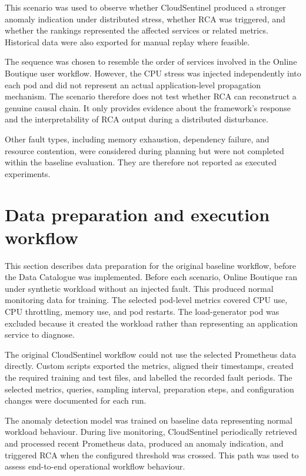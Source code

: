 This scenario was used to observe whether CloudSentinel produced a stronger anomaly indication under distributed stress, whether RCA was triggered, and whether the rankings represented the affected services or related metrics. Historical data were also exported for manual replay where feasible.

The sequence was chosen to resemble the order of services involved in the Online Boutique user workflow. However, the CPU stress was injected independently into each pod and did not represent an actual application-level propagation mechanism. The scenario therefore does not test whether RCA can reconstruct a genuine causal chain. It only provides evidence about the framework's response and the interpretability of RCA output during a distributed disturbance.

Other fault types, including memory exhaustion, dependency failure, and resource contention, were considered during planning but were not completed within the baseline evaluation. They are therefore not reported as executed experiments.

\section{Data preparation and execution workflow}
This section describes data preparation for the original baseline workflow, before the Data Catalogue was implemented. Before each scenario, Online Boutique ran under synthetic workload without an injected fault. This produced normal monitoring data for training. The selected pod-level metrics covered CPU use, CPU throttling, memory use, and pod restarts. The load-generator pod was excluded because it created the workload rather than representing an application service to diagnose.

The original CloudSentinel workflow could not use the selected Prometheus data directly. Custom scripts exported the metrics, aligned their timestamps, created the required training and test files, and labelled the recorded fault periods. The selected metrics, queries, sampling interval, preparation steps, and configuration changes were documented for each run.

The anomaly detection model was trained on baseline data representing normal workload behaviour. During live monitoring, CloudSentinel periodically retrieved and processed recent Prometheus data, produced an anomaly indication, and triggered RCA when the configured threshold was crossed. This path was used to assess end-to-end operational workflow behaviour.

